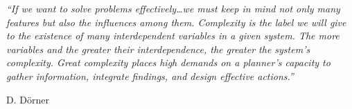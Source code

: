

\epigraph{\textit{``If we want to solve problems effectively\dots we must keep in mind not only many features but also the influences among them. Complexity is the label we will give to the existence of many interdependent variables in a given system. The more variables and the greater their interdependence, the greater the system's complexity. Great complexity places high demands on a planner's capacity to gather information, integrate findings, and design effective actions.''}}{\textmd{D. D\"{o}rner} \cite[p.~38]{Dorner1997a}}


